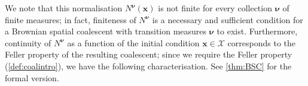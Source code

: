 \documentclass[reqno,draft]{amsart}
\numberwithin{equation}{section}
\theoremstyle{plain}
\theoremstyle{remark}
\newcommand*\diff{\mathop{}\!\mathrm{d}}
\begin{document}


We note that this normalisation $N^{\boldsymbol \nu}(\boldsymbol x)$ is not finite for every collection $\boldsymbol \nu$ of finite measures; in fact, finiteness of $N^{\boldsymbol \nu}$ is a necessary and sufficient condition for a Brownian spatial coalescent with transition measures $\boldsymbol \nu$ to exist. Furthermore, continuity of $N^{\boldsymbol \nu}$ as a function of the initial condition $\boldsymbol x \in \mathcal{X}$ corresponds to the Feller property of the resulting coalescent; since we require the Feller property (\cref{def:coalintro}), we have the following characterisation. See \cref{thm:BSC} for the formal version.
\end{document}
